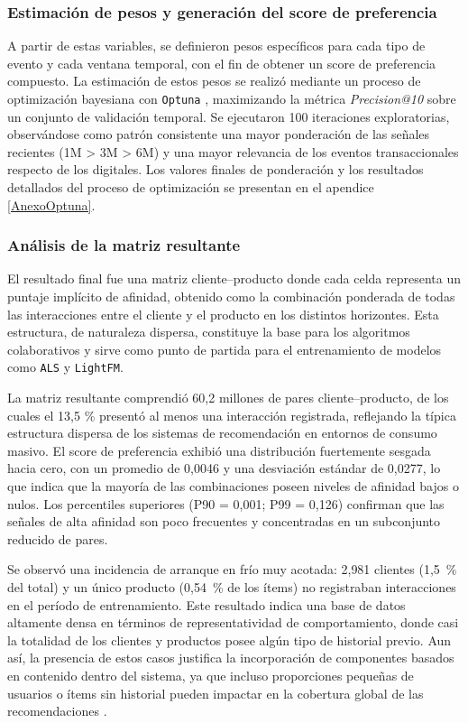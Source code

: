 \subsubsection{Estimación de pesos y generación del score de preferencia}

A partir de estas variables, se definieron pesos específicos para cada tipo de evento y cada ventana temporal, con el fin de obtener un score de preferencia compuesto. La estimación de estos pesos se realizó mediante un proceso de optimización bayesiana con \texttt{Optuna} \cite{ARTICLE:Akiba2019}, maximizando la métrica \textit{Precision@10} sobre un conjunto de validación temporal. Se ejecutaron 100 iteraciones exploratorias, observándose como patrón consistente una mayor ponderación de las señales recientes (1M > 3M > 6M) y una mayor relevancia de los eventos transaccionales respecto de los digitales. Los valores finales de ponderación y los resultados detallados del proceso de optimización se presentan en el apendice \ref{AnexoOptuna}.

\subsubsection{Análisis de la matriz resultante}

El resultado final fue una matriz cliente–producto donde cada celda representa un puntaje implícito de afinidad, obtenido como la combinación ponderada de todas las interacciones entre el cliente y el producto en los distintos horizontes. Esta estructura, de naturaleza dispersa, constituye la base para los algoritmos colaborativos y sirve como punto de partida para el entrenamiento de modelos como \texttt{ALS} y \texttt{LightFM}. 

La matriz resultante comprendió 60{,}2 millones de pares cliente–producto, de los cuales el 13{,}5 \% presentó al menos una interacción registrada, reflejando la típica estructura dispersa de los sistemas de recomendación en entornos de consumo masivo. El score de preferencia exhibió una distribución fuertemente sesgada hacia cero, con un promedio de 0{,}0046 y una desviación estándar de 0{,}0277, lo que indica que la mayoría de las combinaciones poseen niveles de afinidad bajos o nulos. Los percentiles superiores (P90 = 0{,}001; P99 = 0{,}126) confirman que las señales de alta afinidad son poco frecuentes y concentradas en un subconjunto reducido de pares.

Se observó una incidencia de arranque en frío muy acotada: 2{,}981 clientes (1{,}5~\% del total) y un único producto (0{,}54~\% de los ítems) no registraban interacciones en el período de entrenamiento. Este resultado indica una base de datos altamente densa en términos de representatividad de comportamiento, donde casi la totalidad de los clientes y productos posee algún tipo de historial previo. Aun así, la presencia de estos casos justifica la incorporación de componentes basados en contenido dentro del sistema, ya que incluso proporciones pequeñas de usuarios o ítems sin historial pueden impactar en la cobertura global de las recomendaciones \cite{BOOK:Aggarwal2016}.

